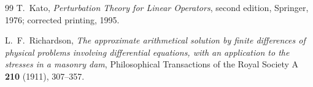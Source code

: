 \documentclass[11pt,oneside]{article}
\theoremstyle{definition}
\theoremstyle{remark}
\begin{document}
\begin{thebibliography}{99}
T.~Kato,
\newblock \emph{Perturbation Theory for Linear Operators},
\newblock second edition, Springer, 1976; corrected printing, 1995.

L.~F.~Richardson,
\newblock \emph{The approximate arithmetical solution by finite differences of physical
problems involving differential equations, with an application to the stresses in a masonry
dam},
\newblock Philosophical Transactions of the Royal Society A \textbf{210} (1911), 307--357.

\end{thebibliography}
\end{document}
